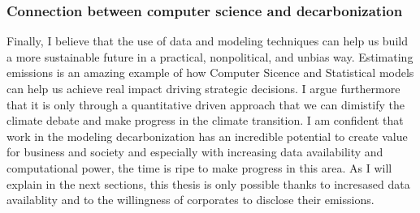 \subsubsection{Connection between computer science and decarbonization}
\noindent Finally, I believe that the use of data and modeling techniques  can help us build a more sustainable future in a practical, nonpolitical, and unbias way. Estimating emissions is an amazing example of how Computer Sicence and Statistical models can help us achieve real impact driving strategic decisions. I argue furthermore that it is only through a quantitative driven approach that we can dimistify the climate debate and make progress in the climate transition. I am confident that work in the modeling decarbonization has an incredible potential to create value for business and society and especially with increasing data availability and computational power, the time is ripe to make progress in this area. As I will explain in the next sections, this thesis is only possible thanks to incresased data availablity and to the willingness of corporates to disclose their emissions.